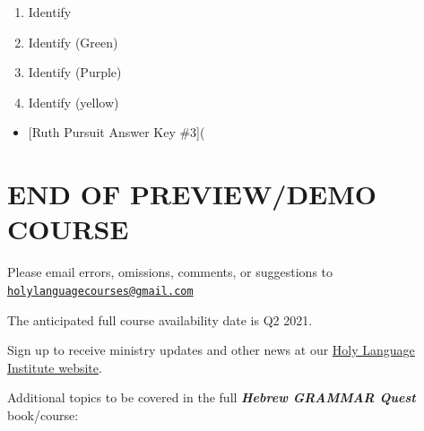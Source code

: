 \documentclass[
]{turabian-researchpaper}
\providecommand{\tightlist}{%
  \setlength{\itemsep}{0pt}\setlength{\parskip}{0pt}}
\begin{document}
\begin{itemize}
\begin{itemize}
    \begin{enumerate}
    \def\labelenumi{\arabic{enumi}.}
    \tightlist
    \item
      Identify \textbar{}
    \item
      Identify (Green)
    \item
      Identify (Purple)
    \item
      Identify (yellow)\\
    \end{enumerate}

    \begin{itemize}
    \tightlist
    \item
      {[}Ruth Pursuit Answer Key \#3{]}(
    \end{itemize}
  \end{itemize}
\end{itemize}

\hypertarget{end-of-previewdemo-course}{%
\section*{END OF PREVIEW/DEMO COURSE}\label{end-of-previewdemo-course}}

Please email errors, omissions, comments, or suggestions to \href{mailto:holylanguagecourses@gmail.com}{\nolinkurl{holylanguagecourses@gmail.com}}

The anticipated full course availability date is Q2 2021.

Sign up to receive ministry updates and other news at our \href{https://holylanguage.com}{Holy Language Institute website}.

Additional topics to be covered in the full \textbf{\emph{Hebrew GRAMMAR Quest}} book/course:
\end{document}
